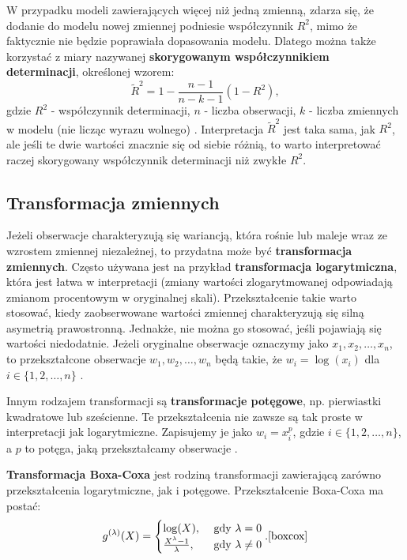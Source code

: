 \documentclass[12pt]{mwbk}
\theoremstyle{plain}
\theoremstyle{definition}
\theoremstyle{definition}
\begin{document}
W przypadku modeli zawierających więcej niż jedną zmienną, zdarza się, że dodanie do modelu nowej zmiennej podniesie współczynnik $R^2$, mimo że faktycznie nie będzie poprawiała dopasowania modelu. Dlatego można także korzystać z miary nazywanej \textbf{skorygowanym współczynnikiem determinacji}, określonej wzorem:
$$\tilde{R}^2=1-\frac{n-1}{n-k-1}(1-R^2),$$
gdzie $R^2$ - współczynnik determinacji, $n$ - liczba obserwacji, $k$ - liczba zmiennych w modelu (nie licząc wyrazu wolnego) \cite{skorygowany}. Interpretacja $\tilde{R}^2$ jest taka sama, jak $R^2$, ale jeśli te dwie wartości znacznie się od siebie różnią, to warto interpretować raczej skorygowany współczynnik determinacji niż zwykłe $R^2$.

\subsection{Transformacja zmiennych}

Jeżeli obserwacje charakteryzują się wariancją, która rośnie lub maleje wraz ze wzrostem zmiennej niezależnej, to przydatna może być \textbf{transformacja zmiennych}. Często używana jest na przykład \textbf{transformacja logarytmiczna}, która jest łatwa w interpretacji (zmiany wartości zlogarytmowanej odpowiadają zmianom procentowym w oryginalnej skali). Przekształcenie takie warto stosować, kiedy zaobserwowane wartości zmiennej charakteryzują się silną asymetrią prawostronną. Jednakże, nie można go stosować, jeśli pojawiają się wartości niedodatnie. Jeżeli oryginalne obserwacje oznaczymy jako $x_1, x_2,\ldots, x_n$, to przekształcone obserwacje $w_1, w_2,\ldots,w_n$ będą takie, że $w_i=\log(x_i)$ dla $i \in \lbrace{1,2,\ldots,n\rbrace}$ \cite{forecasting}.

Innym rodzajem transformacji są \textbf{transformacje potęgowe}, np. pierwiastki kwadratowe lub sześcienne. Te przekształcenia nie zawsze są tak proste w interpretacji jak logarytmiczne. Zapisujemy je jako $w_i=x_i^p$, gdzie $i \in \lbrace{1,2,\ldots,n\rbrace}$, a $p$ to potęga, jaką przekształcamy obserwacje \cite{forecasting}.

\textbf{Transformacja Boxa-Coxa} jest rodziną transformacji zawierającą zarówno przekształcenia logarytmiczne, jak i potęgowe. Przekształcenie Boxa-Coxa ma postać:
$$g^{(\lambda)}(X)=\begin{cases}
\log(X), & \text{ gdy } \lambda=0 \\
\frac{X^{\lambda}-1}{\lambda},&\text{ gdy } \lambda \neq 0
\end{cases}. \cite{boxcox}$$
\end{document}
